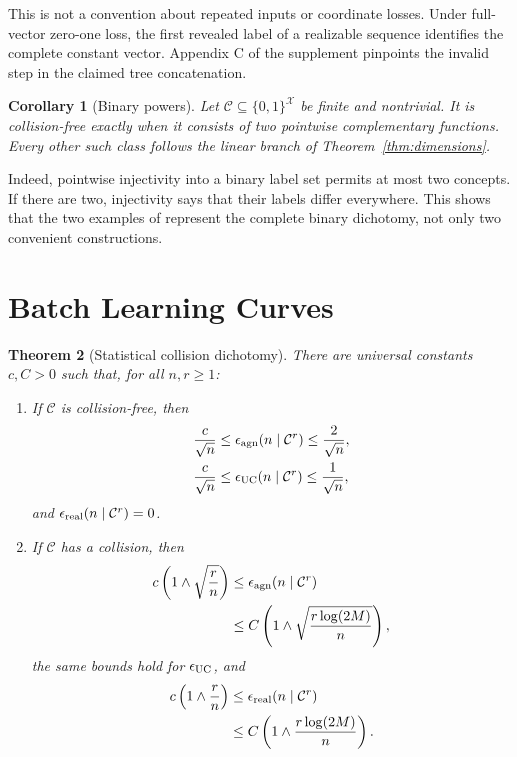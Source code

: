 \documentclass[twoside]{article}
\newtheorem{theorem}{Theorem}
\newtheorem{corollary}[theorem]{Corollary}
\newcommand{\C}{\mathcal C}
\begin{document}
This is not a convention about repeated inputs or coordinate losses. Under full-vector zero-one loss, the first revealed label of a realizable sequence identifies the complete constant vector. Appendix C of the supplement pinpoints the invalid step in the claimed tree concatenation.

\begin{corollary}[Binary powers]
\label{cor:binary}
Let $\C\subseteq\{0,1\}^{\mathcal X}$ be finite and nontrivial. It is collision-free exactly when it consists of two pointwise complementary functions. Every other such class follows the linear branch of Theorem~\ref{thm:dimensions}.
\end{corollary}

Indeed, pointwise injectivity into a binary label set permits at most two concepts. If there are two, injectivity says that their labels differ everywhere. This shows that the two examples of \citet{more2026} represent the complete binary dichotomy, not only two convenient constructions.

\section{Batch Learning Curves}
\label{sec:batch}

\begin{theorem}[Statistical collision dichotomy]
\label{thm:batch}
There are universal constants $c,C>0$ such that, for all $n,r\geq1$:
\begin{enumerate}
\item If $\C$ is collision-free, then
\begin{align*}
 \frac{c}{\sqrt n}&\leq\epsilon_{\rm agn}(n\mid\C^r)\leq\frac{2}{\sqrt n},\\
 \frac{c}{\sqrt n}&\leq\epsilon_{\rm UC}(n\mid\C^r)\leq\frac{1}{\sqrt n},
\end{align*}
and $\epsilon_{\rm real}(n\mid\C^r)=0$.
\item If $\C$ has a collision, then
\begin{align*}
 c\left(1\wedge\sqrt{\frac rn}\right)
 &\leq\epsilon_{\rm agn}(n\mid\C^r)\\
 &\leq C\left(1\wedge\sqrt{\frac{r\log(2M)}n}\right),
\end{align*}
the same bounds hold for $\epsilon_{\rm UC}$, and
\begin{align*}
 c\left(1\wedge\frac rn\right)
 &\leq\epsilon_{\rm real}(n\mid\C^r)\\
 &\leq C\left(1\wedge\frac{r\log(2M)}n\right).
\end{align*}
\end{enumerate}
\end{theorem}
\end{document}
